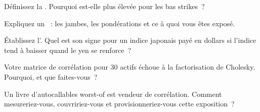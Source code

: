 \begin{interviewq}\label{iq:dv:multi-asset-options:2}
Définissez la . Pourquoi est-elle plus élevée pour les bas strikes~?
\end{interviewq}

\begin{interviewq}\label{iq:dv:multi-asset-options:3}
Expliquez un ~: les jambes, les pondérations et ce à quoi vous êtes exposé.
\end{interviewq}

\begin{interviewq}\label{iq:dv:multi-asset-options:4}
Établissez l'. Quel est son signe pour un indice japonais payé en dollars si l'indice tend à baisser quand le yen
se renforce~?
\end{interviewq}

\begin{interviewq}\label{iq:dv:multi-asset-options:5}
Votre matrice de corrélation pour 30 actifs échoue à la factorisation de Cholesky. Pourquoi, et que faites-vous~?
\end{interviewq}

\begin{interviewq}\label{iq:dv:multi-asset-options:6}
Un livre d'autocallables worst-of est vendeur de corrélation. Comment mesureriez-vous, couvririez-vous et provisionneriez-vous cette exposition~?
\end{interviewq}

